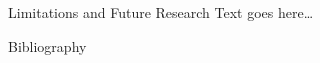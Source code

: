 \documentclass{beamer}
\begin{document}
\begin{frame}{Limitations and Future Research}
	Text goes here\ldots
\end{frame}


\sloppy
\begin{frame}{Bibliography}
	\printbibliography
\end{frame}

\end{document}
